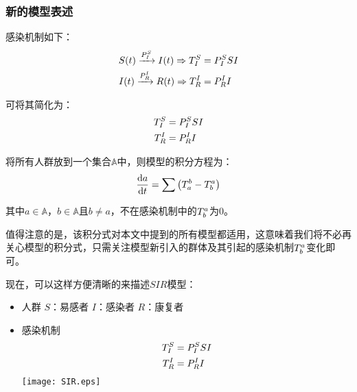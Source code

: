 \subsubsection{新的模型表述}
\par 感染机制如下：
\begin{align}
	S(t)\xrightarrow{P^{S}_{I}}I(t) \Rightarrow T^{S}_{I}&=P^{S}_{I}SI \\
	I(t)\xrightarrow{P^{I}_{R}}R(t) \Rightarrow T^{I}_{R}&=P^{I}_{R}I
\end{align}
\par 可将其简化为：
\begin{align}
	T^{S}_{I}&=P^{S}_{I}SI \\
	T^{I}_{R}&=P^{I}_{R}I
\end{align}
\par 将所有人群放到一个集合$\mathbb{A}$中，则模型的积分方程为：
\begin{equation}
	\frac{\mathrm{d}a}{\mathrm{d}t} = \sum\left(T^{b}_{a}-T^{a}_{b}\right)
\end{equation}
\par 其中$a\in\mathbb{A}$，$b\in\mathbb{A}$且$b\not=a$，不在感染机制中的$T^{a}_{b}$为$0$。
\par 值得注意的是，该积分式对本文中提到的所有模型都适用，这意味着我们将不必再关心模型的积分式，只需关注模型新引入的群体及其引起的感染机制$T^{a}_{b}$变化即可。
\par 现在，可以这样方便清晰的来描述$SIR$模型：
\begin{itemize}
	\item 人群
	      \subitem $S$：易感者
	      \subitem $I$：感染者
	      \subitem $R$：康复者
	\item 感染机制
	      \subitem
	      \begin{align}
		      T^{S}_{I}&=P^{S}_{I}SI \\
		      T^{I}_{R}&=P^{I}_{R}I
	      \end{align}
	      \texttt{[image: SIR.eps]}
\end{itemize}
